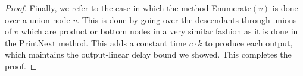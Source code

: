 \begin{proof}
Finally, we refer to the case in which the method {\sc Enumerate}$(v)$ is done over a union node $v$. This is done by going over the descendants-through-unions of $v$ which are product or bottom nodes in a very similar fashion as it is done in the {\sc PrintNext} method. This adds a constant time $c\cdot k$ to produce each output, which maintains the output-linear delay bound we showed. This completes the proof. \end{proof}